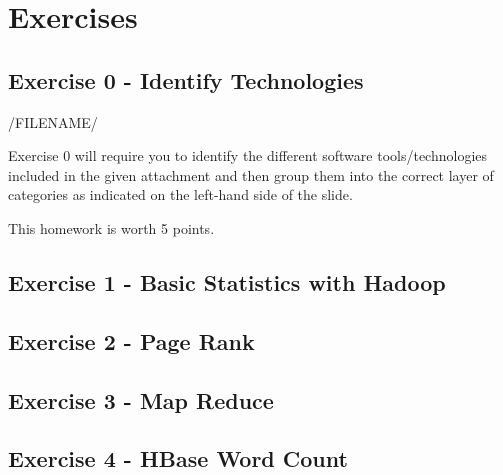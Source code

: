 \part{Exercises}\label{assignments}

\chapter{Exercise 0 - Identify Technologies}\label{assignment-0}

/FILENAME/

Exercise 0 will require you to identify the different software
tools/technologies included in the given attachment and then group them
into the correct layer of categories as indicated on the left-hand side
of the slide.

This homework is worth 5 points.


\chapter{Exercise 1 - Basic Statistics with Hadoop}\label{exercise-1}




\chapter{Exercise 2 - Page Rank}\label{exercise-2}



\chapter{Exercise 3 - Map Reduce}\label{exercise-3}



\chapter{Exercise 4 - HBase Word Count}\label{exercise-4}



% 

